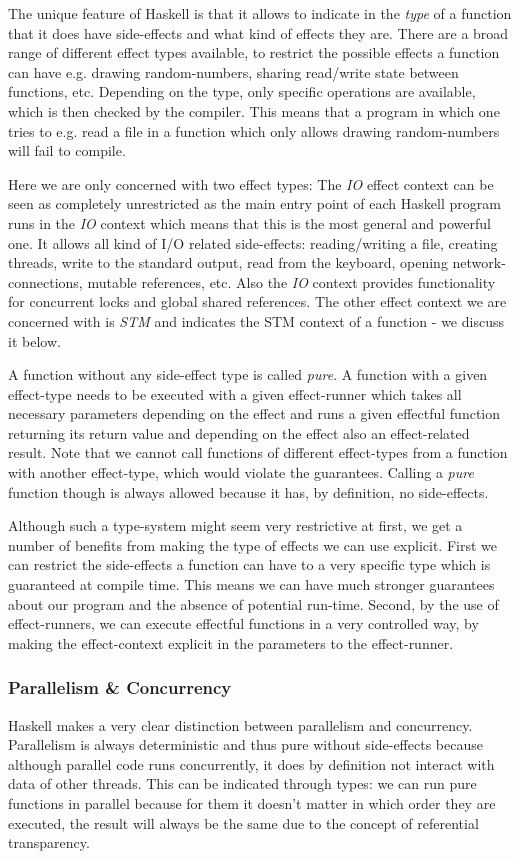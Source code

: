 The unique feature of Haskell is that it allows to indicate in the \textit{type} of a function that it does have side-effects and what kind of effects they are. There are a broad range of different effect types available, to restrict the possible effects a function can have e.g. drawing random-numbers, sharing read/write state between functions, etc. Depending on the type, only specific operations are available, which is then checked by the compiler. This means that a program in which one tries to e.g. read a file in a function which only allows drawing random-numbers will fail to compile.

Here we are only concerned with two effect types: The \textit{IO} effect context can be seen as completely unrestricted as the main entry point of each Haskell program runs in the \textit{IO} context which means that this is the most general and powerful one. It allows all kind of I/O related side-effects: reading/writing a file, creating threads, write to the standard output, read from the keyboard, opening network-connections, mutable references, etc. Also the \textit{IO} context provides functionality for concurrent locks and global shared references. The other effect context we are concerned with is \textit{STM} and indicates the STM context of a function - we discuss it below. 

A function without any side-effect type is called \textit{pure}. A function with a given effect-type needs to be executed with a given effect-runner which takes all necessary parameters depending on the effect and runs a given effectful function returning its return value and depending on the effect also an effect-related result. Note that we cannot call functions of different effect-types from a function with another effect-type, which would violate the guarantees. Calling a \textit{pure} function though is always allowed because it has, by definition, no side-effects. 

Although such a type-system might seem very restrictive at first, we get a number of benefits from making the type of effects we can use explicit. First we can restrict the side-effects a function can have to a very specific type which is guaranteed at compile time. This means we can have much stronger guarantees about our program and the absence of potential run-time. Second, by the use of effect-runners, we can execute effectful functions in a very controlled way, by making the effect-context explicit in the parameters to the effect-runner.

\subsubsection{Parallelism \& Concurrency}
Haskell makes a very clear distinction between parallelism and concurrency. Parallelism is always deterministic and thus pure without side-effects because although parallel code runs concurrently, it does by definition not interact with data of other threads. This can be indicated through types: we can run pure functions in parallel because for them it doesn't matter in which order they are executed, the result will always be the same due to the concept of referential transparency.

